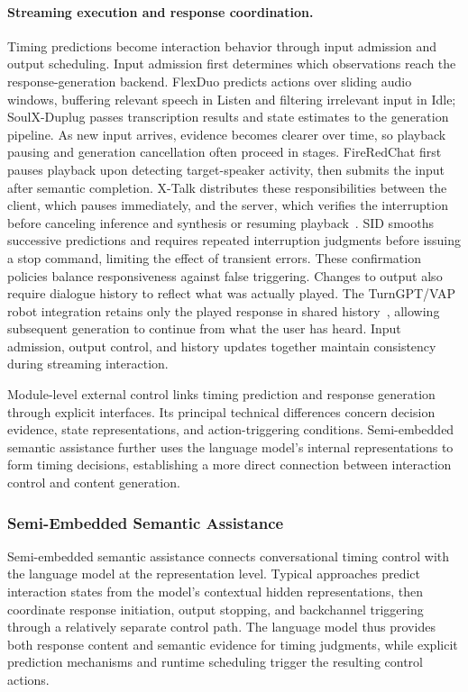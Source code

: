 \paragraph{Streaming execution and response coordination.}
Timing predictions become interaction behavior through input admission and output scheduling. Input admission first determines which observations reach the response-generation backend. FlexDuo predicts actions over sliding audio windows, buffering relevant speech in Listen and filtering irrelevant input in Idle; SoulX-Duplug passes transcription results and state estimates to the generation pipeline. As new input arrives, evidence becomes clearer over time, so playback pausing and generation cancellation often proceed in stages. FireRedChat first pauses playback upon detecting target-speaker activity, then submits the input after semantic completion. X-Talk distributes these responsibilities between the client, which pauses immediately, and the server, which verifies the interruption before canceling inference and synthesis or resuming playback~\citep{DBLP:journals/corr/abs-2512-18706}. SID smooths successive predictions and requires repeated interruption judgments before issuing a stop command, limiting the effect of transient errors. These confirmation policies balance responsiveness against false triggering. Changes to output also require dialogue history to reflect what was actually played. The TurnGPT/VAP robot integration retains only the played response in shared history~\citep{DBLP:journals/corr/abs-2501-08946}, allowing subsequent generation to continue from what the user has heard. Input admission, output control, and history updates together maintain consistency during streaming interaction.

Module-level external control links timing prediction and response generation through explicit interfaces. Its principal technical differences concern decision evidence, state representations, and action-triggering conditions. Semi-embedded semantic assistance further uses the language model's internal representations to form timing decisions, establishing a more direct connection between interaction control and content generation.

\subsubsection{Semi-Embedded Semantic Assistance}\label{sec:fd-semi}

Semi-embedded semantic assistance connects conversational timing control with the language model at the representation level. Typical approaches predict interaction states from the model's contextual hidden representations, then coordinate response initiation, output stopping, and backchannel triggering through a relatively separate control path. The language model thus provides both response content and semantic evidence for timing judgments, while explicit prediction mechanisms and runtime scheduling trigger the resulting control actions.


